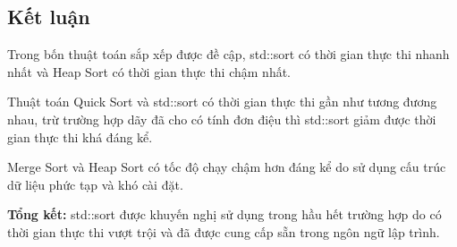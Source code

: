 \documentclass[12pt]{report}
\begin{document}
	\subsection*{Kết luận}
	
	Trong bốn thuật toán sắp xếp được đề cập, std::sort có thời gian thực thi nhanh nhất và Heap Sort có thời gian thực thi chậm nhất.
	
	Thuật toán Quick Sort và std::sort có thời gian thực thi gần như tương đương nhau, trừ trường hợp dãy đã cho có tính đơn điệu thì std::sort giảm được thời gian thực thi khá đáng kể.
	
	Merge Sort và Heap Sort có tốc độ chạy chậm hơn đáng kể do sử dụng cấu trúc dữ liệu phức tạp và khó cài đặt.
	
	\textbf{Tổng kết:} std::sort được khuyến nghị sử dụng trong hầu hết trường hợp do có thời gian thực thi vượt trội và đã được cung cấp sẵn trong ngôn ngữ lập trình.
	
\end{document}
